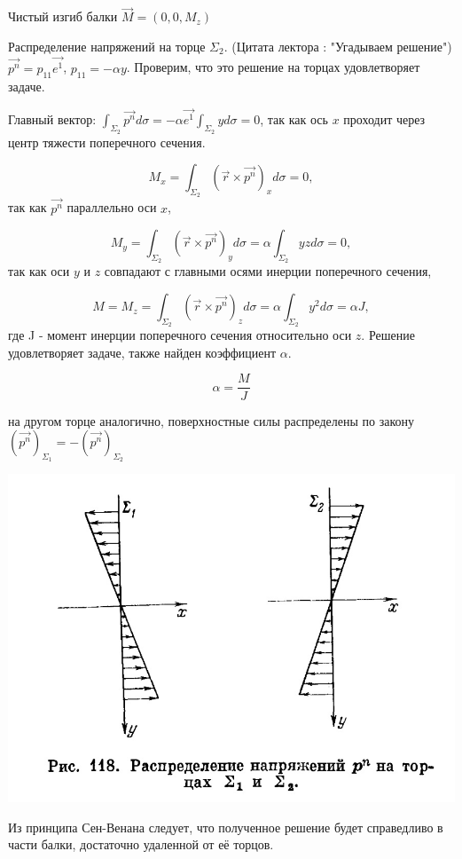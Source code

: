 Чистый изгиб балки $\vec{M} = (0,0,M_z)$


Распределение напряжений на торце $\Sigma_2$.
(Цитата лектора : "Угадываем решение") $\vec{p^n} = p_{11}\vec{e^1}$, $p_{11} = - \alpha y$. Проверим, что это решение на торцах удовлетворяет задаче.

Главный вектор: $ \int_{\Sigma_2} {\vec{p^n} d{\sigma}} = -\alpha \vec{e^1} \int_{\Sigma_2} {y d{\sigma}} = 0$, так как ось $x$ проходит через центр тяжести поперечного сечения.

$$ M_x = \int_{\Sigma_2} {(\vec{r} \times \vec{p^n})_x d{\sigma}} = 0,$$
\noindent так как $\vec{p^n}$ параллельно оси $x$,

$$ M_y = \int_{\Sigma_2} {(\vec{r} \times \vec{p^n})_y d{\sigma}} = \alpha \int_{\Sigma_2} {yz d{\sigma}} = 0,$$
\noindent так как оси $y$ и $z$ совпадают с главными осями инерции поперечного сечения,

$$ M = M_z = \int_{\Sigma_2} {(\vec{r} \times \vec{p^n})_z d{\sigma}} = \alpha \int_{\Sigma_2} {y^2 d{\sigma}} = \alpha J,$$
\noindent где J - момент инерции поперечного сечения относительно оси $z$. Решение удовлетворяет задаче, также найден коэффициент $\alpha$.

$$ \alpha = \frac{M}{J} $$

на другом торце аналогично, поверхностные силы распределены по закону $(\vec{p^n})_{\Sigma_1} = - (\vec{p^n})_{\Sigma_2}$

\includegraphics[scale=0.5]{20/t21_2.jpg}

Из принципа Сен-Венана следует, что полученное решение будет справедливо в части балки, достаточно удаленной от её торцов.

